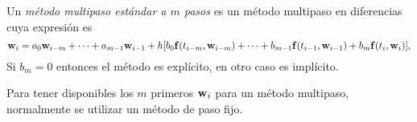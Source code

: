 \begin{definition}
    Un \emph{método multipaso estándar a $m$ pasos}
    es un método multipaso en diferencias cuya expresión es
    \begin{equation*}
        \vb{w}{}_i = a_0\vb{w}{}_{i-m} + \dots + a_{m-1}\vb{w}{}_{i-1} + h[
            b_0\vb{f}{}(t_{i-m},\vb{w}{}_{i-m}) + \dots + b_{m-1}\vb{f}{}(t_{i-1},\vb{w}{}_{i-1})
            + b_m\vb{f}{}(t_i,\vb{w}{}_i)
        ],
    \end{equation*}
    Si $b_m = 0$ entonces el método es explícito, en otro caso es implícito.
\end{definition}

Para tener disponibles los $m$ primeros $\vb{w}{}_i$ para un método multipaso,
normalmente se utilizar un método de paso fijo.

